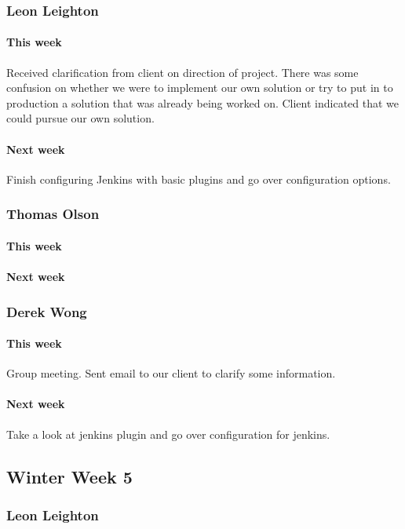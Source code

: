 \documentclass[10pt,letterpaper,onecolumn,draftclsnofoot]{IEEEtran}
\begin{document}
\subsubsection{Leon Leighton}
\paragraph{This week}Received clarification from client on direction of project. There was some confusion on whether we were to implement our own solution or try to put in to production a solution that was already being worked on. Client indicated that we could pursue our own solution.
\paragraph{Next week}Finish configuring Jenkins with basic plugins and go over configuration options.


\subsubsection{Thomas Olson}
\paragraph{This week}
\paragraph{Next week}


\subsubsection{Derek Wong}
\paragraph{This week}Group meeting.    
Sent email to our client to clarify some information.
\paragraph{Next week}Take a look at jenkins plugin and go over configuration for jenkins.


\subsection{Winter Week 5}
\subsubsection{Leon Leighton}
\end{document}
